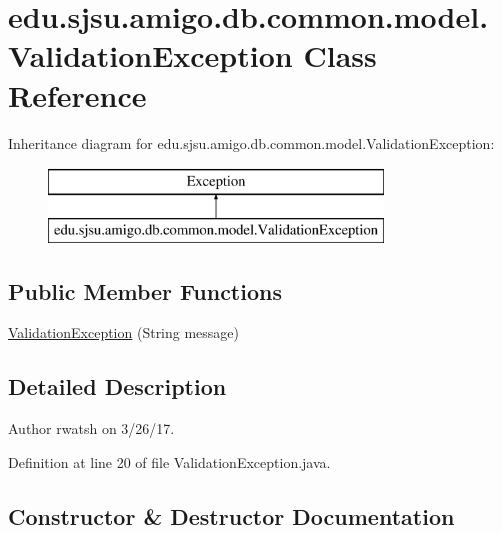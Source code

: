 \hypertarget{classedu_1_1sjsu_1_1amigo_1_1db_1_1common_1_1model_1_1_validation_exception}{}\section{edu.\+sjsu.\+amigo.\+db.\+common.\+model.\+Validation\+Exception Class Reference}
\label{classedu_1_1sjsu_1_1amigo_1_1db_1_1common_1_1model_1_1_validation_exception}
Inheritance diagram for edu.\+sjsu.\+amigo.\+db.\+common.\+model.\+Validation\+Exception\+:\begin{figure}[H]
\begin{center}
\leavevmode
\includegraphics[height=2.000000cm]{classedu_1_1sjsu_1_1amigo_1_1db_1_1common_1_1model_1_1_validation_exception}
\end{center}
\end{figure}
\subsection*{Public Member Functions}
\begin{DoxyCompactItemize}
\item 
\hyperlink{classedu_1_1sjsu_1_1amigo_1_1db_1_1common_1_1model_1_1_validation_exception_a042d1cfb7f93eb62a1bf2773adc52044}{Validation\+Exception} (String message)
\end{DoxyCompactItemize}


\subsection{Detailed Description}
\begin{DoxyAuthor}{Author}
rwatsh on 3/26/17. 
\end{DoxyAuthor}


Definition at line 20 of file Validation\+Exception.\+java.



\subsection{Constructor \& Destructor Documentation}
\mbox{\label{classedu_1_1sjsu_1_1amigo_1_1db_1_1common_1_1model_1_1_validation_exception_a042d1cfb7f93eb62a1bf2773adc52044}} 
